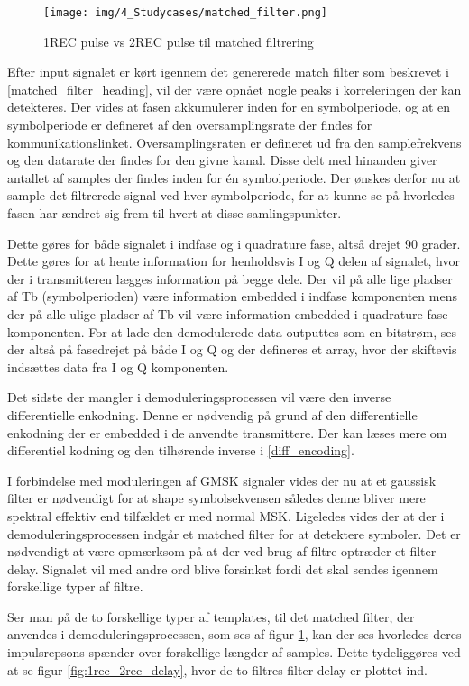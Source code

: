 \begin{appendices}
\begin{figure}[H]
	\centering{}
	\texttt{[image: img/4\_Studycases/matched\_filter.png]}
	\caption{1REC pulse vs 2REC pulse til matched filtrering}
	\label{fig:1rec_2rec}
\end{figure} 

Efter input signalet er kørt igennem det genererede match filter som beskrevet i \ref{matched_filter_heading}, vil der være opnået nogle peaks i korreleringen der kan detekteres. Der vides at fasen akkumulerer inden for en symbolperiode, og at en symbolperiode er defineret af den oversamplingsrate der findes for kommunikationslinket. Oversamplingsraten er defineret ud fra den samplefrekvens og den datarate der findes for den givne kanal. Disse delt med hinanden giver antallet af samples der findes inden for én symbolperiode. Der ønskes derfor nu at sample det filtrerede signal ved hver symbolperiode, for at kunne se på hvorledes fasen har ændret sig frem til hvert at disse samlingspunkter. 

Dette gøres for både signalet i indfase og i quadrature fase, altså drejet 90 grader. Dette gøres for at hente information for henholdsvis I og Q delen af signalet, hvor der i transmitteren lægges information på begge dele. Der vil på alle lige pladser af Tb (symbolperioden) være information embedded i indfase komponenten mens der på alle ulige pladser af Tb vil være information embedded i quadrature fase komponenten. For at lade den demodulerede data outputtes som en bitstrøm, ses der altså på fasedrejet på både I og Q og der defineres et array, hvor der skiftevis indsættes data fra I og Q komponenten. 

Det sidste der mangler i demoduleringsprocessen vil være den inverse differentielle enkodning. Denne er nødvendig på grund af den differentielle enkodning der er embedded i de anvendte transmittere. Der kan læses mere om differentiel kodning og den tilhørende inverse i \ref{diff_encoding}.

I forbindelse med moduleringen af GMSK signaler vides der nu at et gaussisk filter er nødvendigt for at shape symbolsekvensen således denne bliver mere spektral effektiv end tilfældet er med normal MSK. Ligeledes vides der at der i demoduleringsprocessen indgår et matched filter for at detektere symboler. Det er nødvendigt at være opmærksom på at der ved brug af filtre optræder et filter delay. Signalet vil med andre ord blive forsinket fordi det skal sendes igennem forskellige typer af filtre. 

Ser man på de to forskellige typer af templates, til det matched filter, der anvendes i demoduleringsprocessen, som ses af figur \ref{fig:1rec_2rec}, kan der ses hvorledes deres impulsrepsons spænder over forskellige længder af samples. Dette tydeliggøres ved at se figur \ref{fig:1rec_2rec_delay}, hvor de to filtres filter delay er plottet ind. 


\end{appendices}
